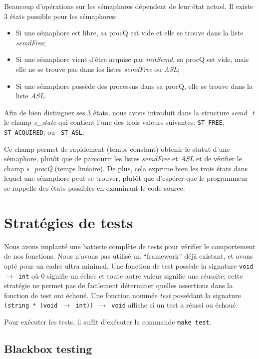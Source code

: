 \documentclass[10pt]{article}
\begin{document}
Beaucoup d'opérations sur les sémaphores dépendent de leur état
actuel.  Il existe 3 états possible pour les sémaphores:

\begin{itemize}
\item Si une sémaphore est libre, sa procQ est vide et elle se trouve
  dans la liste \emph{semdFree};
\item Si une sémaphore vient d'être acquise par \emph{initSemd}, sa
  procQ est vide, mais elle ne se trouve pas dans les listes
  \emph{semdFree} ou \emph{ASL};
\item Si une sémaphore possède des processus dans sa procQ, elle se
  trouve dans la liste \emph{ASL}.
\end{itemize}

Afin de bien distinguer ses 3 états, nous avons introduit dans la
structure \emph{semd\_t} le champ \emph{s\_state} qui contient l'une des
trois valeurs suivantes: {\tt ST\_FREE}, {\tt ST\_ACQUIRED}, ou {\tt
  ST\_ASL}.

Ce champ permet de rapidement (temps constant) obtenir le statut d'une
sémaphore, plutôt que de parcourir les listes \emph{semdFree} et
\emph{ASL} et de vérifier le champ \emph{s\_procQ} (temps linéaire).
De plus, cela exprime bien les trois états dans lequel une sémaphore
peut se trouver, plutôt que d'espérer que le programmeur se rappelle
des états possibles en examinant le code source.

\section{Stratégies de tests}

Nous avons implanté une batterie complète de tests pour vérifier le
comportement de nos fonctions.  Nous n'avons pas utilisé un
``framework'' déjà existant, et avons opté pour un cadre ultra
minimal.  Une fonction de test possède la signature {\tt void $\to$
  int} où 0 signifie un échec et toute autre valeur signifie une
réussite; cette stratégie ne permet pas de facilement déterminer
quelles assertions dans la fonction de test ont échoué.  Une fonction
nommée \emph{test} possédant la signature {\tt (string * (void $\to$
  int)) $\to$ void} affiche si un test a réussi ou échoué.

Pour exécuter les tests, il suffit d'exécuter la commande {\tt make
  test}.

\subsection{Blackbox testing}
\end{document}

